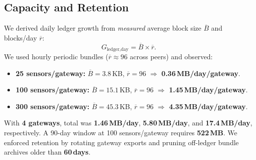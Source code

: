 \documentclass[12pt,onecolumn]{IEEEtran} %
\begin{document}
\subsection{Capacity and Retention}
\label{sec:capacity-retention}

We derived daily ledger growth from \emph{measured} average block size \(\overline{B}\) and blocks/day \(\overline{r}\):
\[
  G_{\text{ledger,day}}=\overline{B}\times\overline{r}.
\]
We used hourly periodic bundles (\(\overline{r}\approx 96\) across peers) and observed:

\begin{itemize}
  \item \textbf{25 sensors/gateway:} \(\overline{B}{=}3.8\)\,KB, \(\overline{r}{=}96\) \(\Rightarrow\) \textbf{0.36\,MB/day/gateway}.
  \item \textbf{100 sensors/gateway:} \(\overline{B}{=}15.1\)\,KB, \(\overline{r}{=}96\) \(\Rightarrow\) \textbf{1.45\,MB/day/gateway}.
  \item \textbf{300 sensors/gateway:} \(\overline{B}{=}45.3\)\,KB, \(\overline{r}{=}96\) \(\Rightarrow\) \textbf{4.35\,MB/day/gateway}.
\end{itemize}

With \textbf{4 gateways}, total was \textbf{1.46\,MB/day}, \textbf{5.80\,MB/day}, and \textbf{17.4\,MB/day}, respectively.
A 90-day window at 100 sensors/gateway requires \textbf{522\,MB}.
We enforced retention by rotating gateway exports and pruning off-ledger bundle archives older than \textbf{60\,days}.
\end{document}
